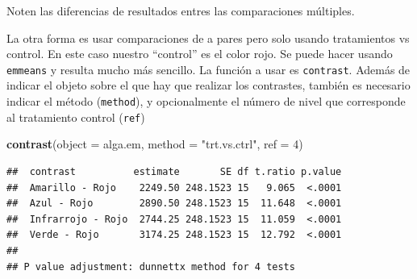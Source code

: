 \documentclass[]{book}
\newenvironment{Shaded}{\begin{snugshade}}{\end{snugshade}}
\newcommand{\DataTypeTok}[1]{\textcolor[rgb]{0.13,0.29,0.53}{#1}}
\newcommand{\DecValTok}[1]{\textcolor[rgb]{0.00,0.00,0.81}{#1}}
\newcommand{\KeywordTok}[1]{\textcolor[rgb]{0.13,0.29,0.53}{\textbf{#1}}}
\newcommand{\NormalTok}[1]{#1}
\newcommand{\StringTok}[1]{\textcolor[rgb]{0.31,0.60,0.02}{#1}}
\theoremstyle{definition}
\theoremstyle{definition}
\theoremstyle{definition}
\theoremstyle{remark}
\begin{document}
Noten las diferencias de resultados entres las comparaciones múltiples.

La otra forma es usar comparaciones de a pares pero solo usando
tratamientos vs control. En este caso nuestro ``control'' es el color
rojo. Se puede hacer usando \texttt{emmeans} y resulta mucho más
sencillo. La función a usar es \texttt{contrast}. Además de indicar el
objeto sobre el que hay que realizar los contrastes, también es
necesario indicar el método (\texttt{method}), y opcionalmente el número
de nivel que corresponde al tratamiento control (\texttt{ref})

\begin{Shaded}
\begin{Highlighting}[]
\KeywordTok{contrast}\NormalTok{(}\DataTypeTok{object =}\NormalTok{ alga.em, }\DataTypeTok{method =} \StringTok{"trt.vs.ctrl"}\NormalTok{, }\DataTypeTok{ref =} \DecValTok{4}\NormalTok{)}
\end{Highlighting}
\end{Shaded}

\begin{verbatim}
##  contrast          estimate       SE df t.ratio p.value
##  Amarillo - Rojo    2249.50 248.1523 15   9.065  <.0001
##  Azul - Rojo        2890.50 248.1523 15  11.648  <.0001
##  Infrarrojo - Rojo  2744.25 248.1523 15  11.059  <.0001
##  Verde - Rojo       3174.25 248.1523 15  12.792  <.0001
## 
## P value adjustment: dunnettx method for 4 tests
\end{verbatim}
\end{document}
